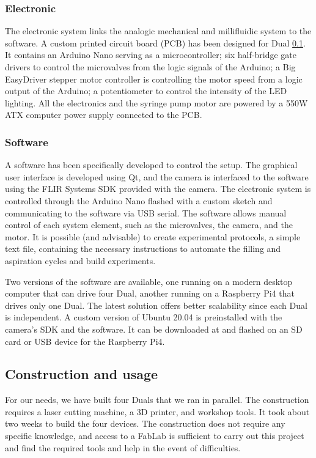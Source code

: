   \subsubsection{Electronic}
  The electronic system links the analogic mechanical and millifluidic system to the software. A custom printed circuit board (PCB) has been designed for Dual \ref{}. It contains an Arduino Nano serving as a microcontroller; six half-bridge gate drivers to control the microvalves from the logic signals of the Arduino; a Big EasyDriver stepper motor controller is controlling the motor speed from a logic output of the Arduino; a potentiometer to control the intensity of the LED lighting. All the electronics and the syringe pump motor are powered by a 550W ATX computer power supply connected to the PCB.

  \subsubsection{Software}
  A software has been specifically developed to control the setup. The graphical user interface is developed using Qt, and the camera is interfaced to the software using the FLIR Systems SDK \url{} provided with the camera. The electronic system is controlled through the Arduino Nano flashed with a custom sketch \url{} and communicating to the software via USB serial. The software allows manual control of each system element, such as the microvalves, the camera, and the motor. It is possible (and advisable) to create experimental protocols, a simple text file, containing the necessary instructions to automate the filling and aspiration cycles and build experiments.

  Two versions of the software are available, one running on a modern desktop computer that can drive four Dual, another running on a Raspberry Pi4 that drives only one Dual. The latest solution offers better scalability since each Dual is independent. A custom version of Ubuntu 20.04 is preinstalled with the camera's SDK and the software. It can be downloaded at \url{} and flashed on an SD card or USB device for the Raspberry Pi4.

  \subsection{Construction and usage}
  For our needs, we have built four Duals that we ran in parallel. The construction requires a laser cutting machine, a 3D printer, and workshop tools. It took about two weeks to build the four devices. The construction does not require any specific knowledge, and access to a FabLab is sufficient to carry out this project and find the required tools and help in the event of difficulties.

